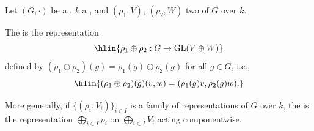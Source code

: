 \begin{definition} \label{definition:direct_sum_of_two_representations_of_a_group_over_a_field}

    Let $(G, \cdot)$ be a , $k$ a , and $(\rho_1, V)$, $(\rho_2, W)$ two  of $G$ over $k$.

    The  is the representation
    $$\hlin{\rho_1 \oplus \rho_2 : G \to \mathrm{GL}(V \oplus W)}$$
    defined by $(\rho_1 \oplus \rho_2)(g) = \rho_1(g) \oplus \rho_2(g)$ for all $g \in G$, i.e.,
    $$\hlin{(\rho_1 \oplus \rho_2)(g)(v, w) = (\rho_1(g)v, \rho_2(g)w).}$$

    More generally, if $\{(\rho_i, V_i)\}_{i \in I}$ is a family of representations of $G$ over $k$, the  is the representation $\bigoplus_{i \in I} \rho_i$ on $\bigoplus_{i \in I} V_i$ acting componentwise.
\end{definition}
